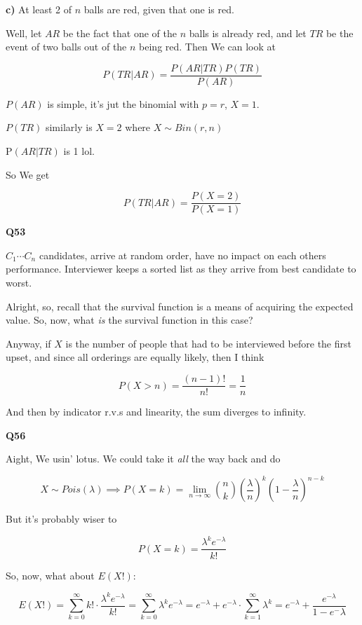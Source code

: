 \documentclass{article}
\begin{document}
		\textbf{c)} At least 2 of $n$ balls are red, given that one is red. 
		
		Well, let $AR$ be the fact that one of the $n$ balls is already red, and let $TR$ be the event of two balls out of the $n$ being red. Then We can look at
		
		\[ P(TR\vert AR) = \frac{P(AR\vert TR)P(TR)}{P(AR)} \]
		
		$P(AR)$ is simple, it's jut the binomial with $p=r$, $X=1$. 
		
		$P(TR)$ similarly is $X=2$ where $X\sim Bin(r, n)$
		
		P$(AR\vert TR)$ is 1 lol.
		
		So We get 
		
		\[ P(TR\vert AR) = \frac{P(X=2)}{P(X=1)} \]
		
		\hfill
		
		\textbf{Q53}
		
		$C_1\cdots C_n$ candidates, arrive at random order, have no impact on each others performance. Interviewer keeps a sorted list as they arrive from best candidate to worst.
		
		Alright, so, recall that the survival function is a means of acquiring the expected value. So, now, what \textit{is} the survival function in this case? 
		
		Anyway, if $X$ is the number of people that had to be interviewed before the first upset, and since all orderings are equally likely, then I think
		
		\[ P(X>n) = \frac{(n-1)!}{n!} = \frac{1}{n} \]

		And then by indicator r.v.s and linearity, the sum diverges to infinity.
		
		\hfill
		
		\textbf{Q56}		
		
		Aight, We usin' lotus. We could take it \textit{all} the way back and do
		
		\[ X\sim Pois(\lambda)\implies P(X=k) = \lim_{n\to\infty} {n\choose k} \left(\frac{\lambda}{n} \right)^k \left(1-\frac{\lambda}{n} \right)^{n-k} \]	
		
		But it's  probably wiser to
		
		\[ P(X=k) = \frac{\lambda^ke^{-\lambda}}{k!} \]	
		
		So, now, what about $E(X!)$:
		
		\[ E(X!) = \sum^\infty_{k=0} k!\cdot  \frac{\lambda^ke^{-\lambda}}{k!} = \sum^\infty_{k=0}  \lambda^ke^{-\lambda} = e^{-\lambda} + e^{-\lambda}\cdot\sum^\infty_{k=1} \lambda^k = e^{-\lambda} + \frac{e^{-\lambda}}{1-e^-{\lambda}}\]
		
\end{document}
